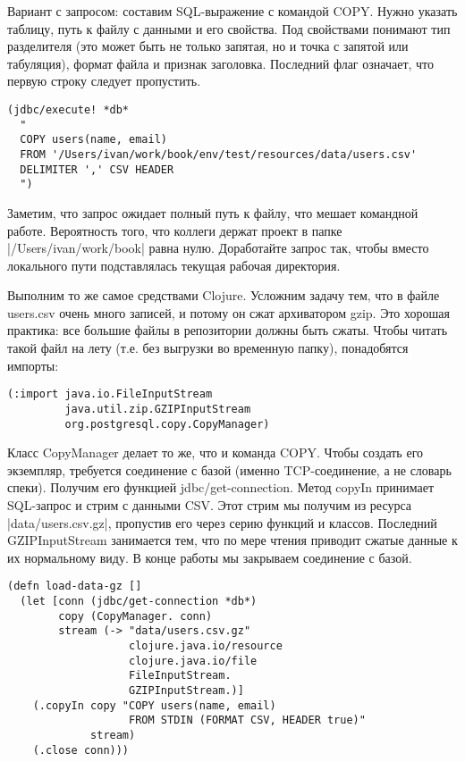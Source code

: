 Вариант с запросом: составим SQL-выражение с командой COPY. Нужно указать
таблицу, путь к файлу с данными и его свойства. Под свойствами понимают тип
разделителя (это может быть не только запятая, но и точка с запятой или
табуляция), формат файла и признак заголовка. Последний флаг означает, что
первую строку следует пропустить.

\begin{verbatim}
(jdbc/execute! *db*
  "
  COPY users(name, email)
  FROM '/Users/ivan/work/book/env/test/resources/data/users.csv'
  DELIMITER ',' CSV HEADER
  ")
\end{verbatim}

Заметим, что запрос ожидает полный путь к файлу, что мешает командной
работе. Вероятность того, что коллеги держат проект в папке
\spverb|/Users/ivan/work/book| равна нулю. Доработайте запрос так, чтобы вместо
локального пути подставлялась текущая рабочая директория.

Выполним то же самое средствами Clojure. Усложним задачу тем, что в файле
users.csv очень много записей, и потому он сжат архиватором gzip. Это хорошая
практика: все большие файлы в репозитории должны быть сжаты. Чтобы читать такой
файл на лету (т.е. без выгрузки во временную папку), понадобятся импорты:

\begin{verbatim}
(:import java.io.FileInputStream
         java.util.zip.GZIPInputStream
         org.postgresql.copy.CopyManager)
\end{verbatim}

Класс CopyManager делает то же, что и команда COPY. Чтобы создать его экземпляр,
требуется соединение с базой (именно TCP-соединение, а не словарь
спеки). Получим его функцией jdbc/get-connection. Метод copyIn принимает
SQL-запрос и стрим с данными CSV. Этот стрим мы получим из ресурса
\spverb|data/users.csv.gz|, пропустив его через серию функций и классов. Последний
GZIPInputStream занимается тем, что по мере чтения приводит сжатые данные к их
нормальному виду. В конце работы мы закрываем соединение с базой.

\begin{verbatim}
(defn load-data-gz []
  (let [conn (jdbc/get-connection *db*)
        copy (CopyManager. conn)
        stream (-> "data/users.csv.gz"
                   clojure.java.io/resource
                   clojure.java.io/file
                   FileInputStream.
                   GZIPInputStream.)]
    (.copyIn copy "COPY users(name, email)
                   FROM STDIN (FORMAT CSV, HEADER true)"
             stream)
    (.close conn)))
\end{verbatim}

